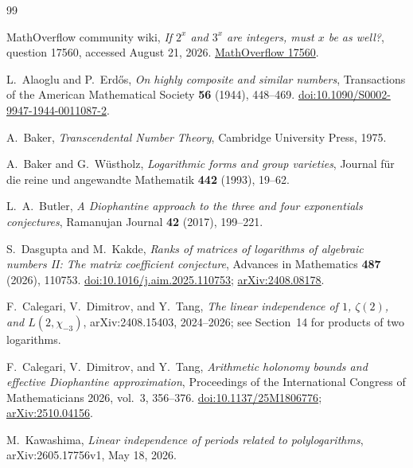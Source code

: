 \documentclass[11pt]{article}
\theoremstyle{definition}
\begin{document}
\begin{thebibliography}{99}

MathOverflow community wiki,
\newblock \emph{If $2^x$ and $3^x$ are integers, must $x$ be as well?},
\newblock question 17560, accessed August 21, 2026.
\newblock \href{https://mathoverflow.net/questions/17560/if-2x-and-3x-are-integers-must-x-be-as-well}{MathOverflow 17560}.

L.~Alaoglu and P.~Erd\H{o}s,
\newblock \emph{On highly composite and similar numbers},
\newblock Transactions of the American Mathematical Society \textbf{56} (1944), 448--469.
\newblock \href{https://doi.org/10.1090/S0002-9947-1944-0011087-2}{doi:10.1090/S0002-9947-1944-0011087-2}.

A.~Baker,
\newblock \emph{Transcendental Number Theory},
\newblock Cambridge University Press, 1975.

A.~Baker and G.~W\"ustholz,
\newblock \emph{Logarithmic forms and group varieties},
\newblock Journal f\"ur die reine und angewandte Mathematik \textbf{442} (1993), 19--62.

L.~A.~Butler,
\newblock \emph{A Diophantine approach to the three and four exponentials conjectures},
\newblock Ramanujan Journal \textbf{42} (2017), 199--221.

S.~Dasgupta and M.~Kakde,
\newblock \emph{Ranks of matrices of logarithms of algebraic numbers II: The matrix coefficient conjecture},
\newblock Advances in Mathematics \textbf{487} (2026), 110753.
\newblock \href{https://doi.org/10.1016/j.aim.2025.110753}{doi:10.1016/j.aim.2025.110753};
\href{https://arxiv.org/abs/2408.08178}{arXiv:2408.08178}.

F.~Calegari, V.~Dimitrov, and Y.~Tang,
\newblock \emph{The linear independence of $1$, $\zeta(2)$, and $L(2,\chi_{-3})$},
\newblock arXiv:2408.15403, 2024--2026; see Section~14 for products of two logarithms.

F.~Calegari, V.~Dimitrov, and Y.~Tang,
\newblock \emph{Arithmetic holonomy bounds and effective Diophantine approximation},
\newblock Proceedings of the International Congress of Mathematicians 2026, vol.~3,
356--376.
\newblock \href{https://doi.org/10.1137/25M1806776}{doi:10.1137/25M1806776};
\href{https://arxiv.org/abs/2510.04156}{arXiv:2510.04156}.

M.~Kawashima,
\newblock \emph{Linear independence of periods related to polylogarithms},
\newblock arXiv:2605.17756v1, May 18, 2026.


\end{thebibliography}
\end{document}
